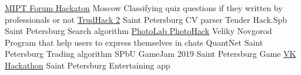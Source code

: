 \documentclass[
	a4paper,
]{fortysecondscv}
\begin{document}
\begin{cvtable}[1.5]
        {\href{https://github.com/SmirnovAlexander/QuestionsClassifier}
        {MIPT Forum Hackaton}}
        {Moscow}
        {Classifying quiz questions if they written by professionals or not}
        {\href{https://github.com/SmirnovAlexander/ParseCV}
        {TrudHack 2}}
        {Saint Petersburg}
        {CV parser}
        {Tender Hack.Spb}
        {Saint Petersburg}
        {Search algorithm}
        {\href{https://github.com/SmirnovAlexander/EmojiCommunicator}
        {PhotoLab PhotoHack}}
        {Veliky Novgorod}
        {Program that help users to express themselves in chats}
        {QuantNet}
        {Saint Petersburg}
        {Trading algorithm}
        {SPbU GameJam 2019}
        {Saint Petersburg}
        {Game}
        {\href{https://github.com/SmirnovAlexander/MemDer}
        {VK Hackathon}}
        {Saint Petersburg}
        {Entertaining app}
\end{cvtable}


\cvsignature
\end{document}
